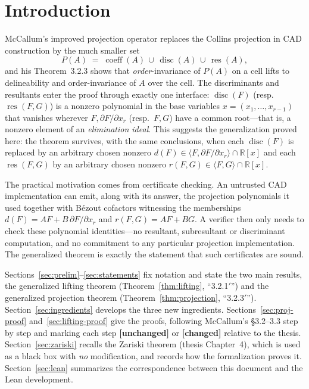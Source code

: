 \documentclass[11pt,a4paper]{article}
\theoremstyle{plain}
\theoremstyle{definition}
\newcommand{\R}{\mathbb{R}}
\DeclareMathOperator{\res}{res}
\DeclareMathOperator{\disc}{disc}
\DeclareMathOperator{\coeff}{coeff}
\newcommand{\ideal}[1]{\langle #1\rangle}
\newcommand{\UNCHANGED}{\textbf{[unchanged]}}
\newcommand{\CHANGED}{\textbf{[changed]}}
\begin{document}
\tableofcontents

\section{Introduction}\label{sec:intro}

McCallum's improved projection operator \cite{McCallum85,McCallum98} replaces
the Collins projection in CAD construction by the much smaller set
\[
  P(A) \;=\; \coeff(A)\,\cup\,\disc(A)\,\cup\,\res(A),
\]
and his Theorem~3.2.3 shows that \emph{order}-invariance of $P(A)$ on a cell
lifts to delineability and order-invariance of $A$ over the cell. The
discriminants and resultants enter the proof through exactly one interface:
$\disc(F)$ (resp.\ $\res(F,G)$) is a nonzero polynomial in the base variables
$x=(x_1,\dots,x_{r-1})$ that vanishes wherever $F,\partial F/\partial x_r$
(resp.\ $F,G$) have a common root---that is, a nonzero element of an
\emph{elimination ideal}. This suggests the generalization proved here: the
theorem survives, with the same conclusions, when each $\disc(F)$ is replaced
by an arbitrary chosen nonzero
$d(F)\in\ideal{F,\partial F/\partial x_r}\cap\R[x]$ and each $\res(F,G)$ by an
arbitrary chosen nonzero $r(F,G)\in\ideal{F,G}\cap\R[x]$.

The practical motivation comes from certificate checking. An untrusted CAD
implementation can emit, along with its answer, the projection polynomials it
used together with B\'ezout cofactors witnessing the memberships
$d(F)=AF+B\,\partial F/\partial x_r$ and $r(F,G)=AF+BG$. A verifier then only
needs to check these polynomial identities---no resultant, subresultant or
discriminant computation, and no commitment to any particular projection
implementation. The generalized theorem is exactly the statement that such
certificates are sound.

Sections~\ref{sec:prelim}--\ref{sec:statements} fix notation and state the two
main results, the generalized lifting theorem (Theorem~\ref{thm:lifting},
``3.2.1$'$'') and the generalized projection theorem
(Theorem~\ref{thm:projection}, ``3.2.3$'$''). Section~\ref{sec:ingredients}
develops the three new ingredients. Sections~\ref{sec:proj-proof}
and~\ref{sec:lifting-proof} give the proofs, following McCallum's \S3.2--3.3
step by step and marking each step \UNCHANGED{} or \CHANGED{} relative to the
thesis. Section~\ref{sec:zariski} recalls the Zariski theorem (thesis
Chapter~4), which is used as a black box with \emph{no} modification, and
records how the formalization proves it. Section~\ref{sec:lean} summarizes the
correspondence between this document and the Lean development.
\end{document}
